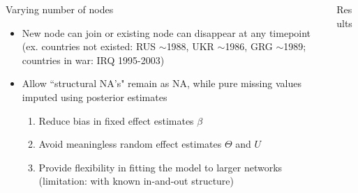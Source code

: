 \documentclass[serif,mathserif,final,table]{beamer}
\begin{document}
\begin{frame}{}
\begin{columns}[t]
\begin{column}{0.235\linewidth}
    
		\begin{block}{Varying number of nodes}
		\begin{itemize}
		\item New node can join or existing node can disappear at any timepoint\\
		\small (ex. countries not existed: RUS $\sim$1988, UKR $\sim$1986, GRG $\sim$1989; countries in war: IRQ 1995-2003)
		\normalsize  
		\item Allow ``structural NA's" remain as NA, while pure missing values imputed using posterior estimates
        \begin{enumerate}
        \item Reduce bias in fixed effect estimates $\beta$
        \item Avoid meaningless random effect estimates $\Theta$ and $U$
        \item Provide flexibility in fitting the model to larger networks (limitation: with known in-and-out structure)
        \end{enumerate}
		\end{itemize}
					\end{block}
      	\end{column}
\begin{column}{0.235\linewidth}  
	\begin{block}{Results}


\end{block}
\end{column}
\end{columns}
\end{frame}
\end{document}
